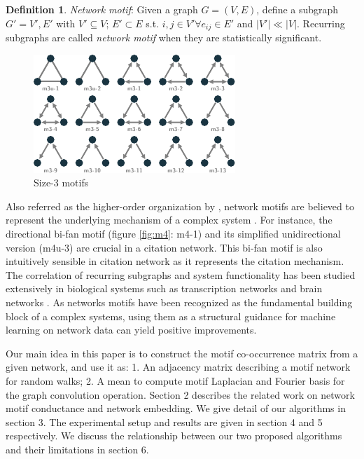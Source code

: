 \documentclass{article}
\theoremstyle{definition}
\newtheorem{definition}{Definition}[section]
\begin{document}
\begin{definition}{\emph{Network motif}}:
Given a graph $G = (V,E)$, define a subgraph $G' = {V', E'}$ with $V' 
\subseteq V$;
$E' \subset E$ s.t. $i,j \in V' \forall e_{ij} \in E'$ and $|V'| \ll |V|$. 
Recurring subgraphs are called \emph{network motif} when they are 
statistically significant.
\end{definition}

\begin{figure} 
    \centering
    \includegraphics[width=0.9\linewidth]{m3}
    \caption{Size-3 motifs}
    \label{fig:m3}
\end{figure}

Also referred as the higher-order organization by \citeauthor{juremotif}, 
network motifs are believed to represent the underlying mechanism of a 
complex system 
\cite{netmotif,alon2006introduction,mangan2003structure}. 
For instance, the directional bi-fan motif (figure \ref{fig:m4}: m4-1)
and its simplified unidirectional version (m4u-3) are crucial in a citation 
network. This bi-fan motif is also intuitively sensible in citation network 
as it represents the citation mechanism. 
The correlation of recurring subgraphs and system 
functionality has been studied extensively in biological systems such as 
transcription networks \cite{mangan2003structure} and brain 
networks \cite{brainnetheuvel,honey2007network}. As networks motifs
have been recognized as the fundamental building block of a complex
systems, using them as a structural guidance for machine learning
on network data can yield positive improvements.

Our main idea in this paper is to construct the motif co-occurrence matrix
from a given network, and use it as: 1. An adjacency matrix describing a 
motif network for random walks; 2. A mean to compute motif Laplacian and 
Fourier basis for the graph convolution operation. Section 2 describes the 
related work on network motif conductance and network embedding. We give 
detail of our algorithms in section 3. The experimental setup and results 
are given in section 4 and 5 respectively. We discuss the relationship 
between our two proposed algorithms and their limitations in section 6.
\end{document}
